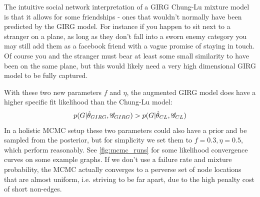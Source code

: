 The intuitive social network interpretation of a GIRG Chung-Lu mixture model is that it allows for some  friendships - ones that wouldn't normally have been predicted by the GIRG model. For instance if you happen to sit next to a stranger on a plane, as long as they don't fall into a sworn enemy category you may still add them as a facebook friend with a vague promise of staying in touch. Of course you and the stranger must bear at least some small similarity to have been on the same plane, but this would likely need a very high dimensional GIRG model to be fully captured. 


With these two new parameters $f$ and $\eta$, the augmented GIRG model does have a higher specific fit likelihood than the Chung-Lu model:
\begin{equation}
  p(G | \hat{\theta}_{GIRG}, \mathscr{G}_{GIRG}) > p(G | \hat{\theta}_{CL}, \mathscr{G}_{CL})
\end{equation}
In a holistic MCMC setup these two parameters could also have a prior and be sampled from the posterior, but for simplicity we set them to $f=0.3, \eta=0.5$, which perform reasonably. See \cref{fig:mcmc_runs} for some likelihood convergence curves on some example graphs. If we don't use a failure rate and mixture probability, the MCMC actually converges to a perverse set of node locations that are almost uniform, i.e. striving to be far apart, due to the high penalty cost of short non-edges.




